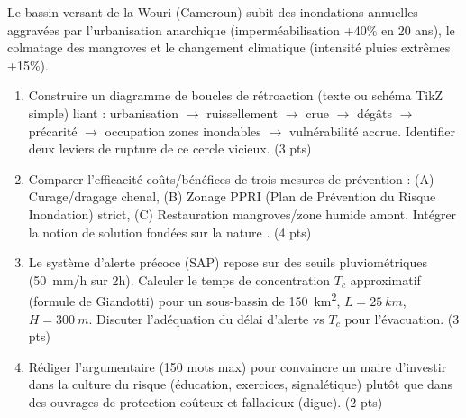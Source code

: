 \documentclass[11pt]{article}
\begin{document}
\begin{exercice}
Le bassin versant de la Wouri (Cameroun) subit des inondations annuelles aggravées par l'urbanisation anarchique (imperméabilisation +40\% en 20 ans), le colmatage des mangroves et le changement climatique (intensité pluies extrêmes +15\%).
\begin{enumerate}
    \item Construire un diagramme de boucles de rétroaction (texte ou schéma TikZ simple) liant : urbanisation $\to$ ruissellement $\to$ crue $\to$ dégâts $\to$ précarité $\to$ occupation zones inondables $\to$ vulnérabilité accrue. Identifier deux leviers de rupture de ce cercle vicieux. \hfill (3 pts)
    \item Comparer l'efficacité coûts/bénéfices de trois mesures de prévention : (A) Curage/dragage chenal, (B) Zonage PPRI (Plan de Prévention du Risque Inondation) strict, (C) Restauration mangroves/zone humide amont. Intégrer la notion de \og solution fondées sur la nature \fg{}. \hfill (4 pts)
    \item Le système d'alerte précoce (SAP) repose sur des seuils pluviométriques (\SI{50}{mm/h} sur 2h). Calculer le temps de concentration $T_c$ approximatif (formule de Giandotti) pour un sous-bassin de \SI{150}{km^2}, $L=\SI{25}{km}$, $H=\SI{300}{m}$. Discuter l'adéquation du délai d'alerte vs $T_c$ pour l'évacuation. \hfill (3 pts)
    \item Rédiger l'argumentaire (150 mots max) pour convaincre un maire d'investir dans la \og culture du risque \fg{} (éducation, exercices, signalétique) plutôt que dans des ouvrages de protection coûteux et fallacieux (digue). \hfill (2 pts)
\end{enumerate}
\end{exercice}
\end{document}
